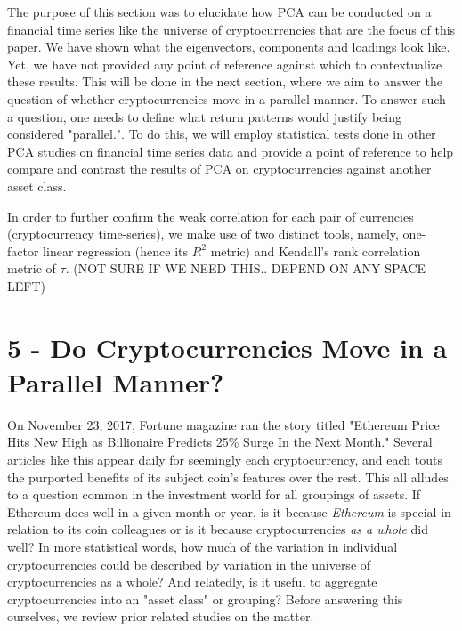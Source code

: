 \documentclass[12pt,twoside]{article}
\begin{document}
\bigbreak

The purpose of this section was to elucidate how PCA can be conducted on a financial time series like the universe of cryptocurrencies that are the focus of this paper. We have shown what the eigenvectors, components and loadings look like. Yet, we have not provided any point of reference against which to contextualize these results. This will be done in the next section, where we aim to answer the question of whether cryptocurrencies move in a parallel manner. To answer such a question, one needs to define what return patterns would justify being considered "parallel.". To do this, we will employ statistical tests done in other PCA studies on financial time series data and provide a point of reference to help compare and contrast the results of PCA on cryptocurrencies against another asset class.

In order to further confirm the weak correlation for each pair of currencies (cryptocurrency time-series), we make use of two distinct tools, namely, one-factor linear regression (hence its $R^2$ metric) and Kendall’s rank correlation metric of $\tau$. (NOT SURE IF WE NEED THIS.. DEPEND ON ANY SPACE LEFT)

\section*{5 - Do Cryptocurrencies Move in a Parallel Manner?}

On November 23, 2017, Fortune magazine ran the story titled "Ethereum Price Hits New High as Billionaire Predicts 25\% Surge In the Next Month." Several articles like this appear daily for seemingly each cryptocurrency, and each touts the purported benefits of its subject coin's features over the rest. This all alludes to a question common in the investment world for all groupings of assets. If Ethereum does well in a given month or year, is it because \textit{Ethereum} is special in relation to its coin colleagues or is it because cryptocurrencies \textit{as a whole} did well? In more statistical words, how much of the variation in individual cryptocurrencies could be described by variation in the universe of cryptocurrencies as a whole? And relatedly, is it useful to aggregate cryptocurrencies into an "asset class" or grouping? Before answering this ourselves, we review prior related studies on the matter.
\end{document}
